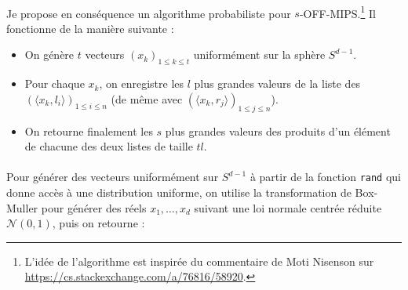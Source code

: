 \documentclass{scrartcl}
\begin{document}
\paragraph*{}
Je propose en conséquence un algorithme probabiliste pour $s$-OFF-MIPS.\footnote{L'idée
de l'algorithme est inspirée du commentaire de Moti Nisenson sur \url{https://cs.stackexchange.com/a/76816/58920}.} Il fonctionne
de la manière suivante :

\begin{itemize}
	\item On génère $t$ vecteurs $(x_k)_{1\le k\le t}$ uniformément sur la sphère $S^{d-1}$.
	\item Pour chaque $x_k$, on enregistre les $l$ plus grandes valeurs de la liste des $(\langle x_k,l_i\rangle)_{1\le i\le n}$ (de même
	avec $(\langle x_k, r_j\rangle)_{1\le j\le n}$).
	\item On retourne finalement les $s$ plus grandes valeurs des produits d'un élément de chacune des deux listes de taille $tl$. 
\end{itemize}





\paragraph*{}
Pour générer des vecteurs uniformément sur $S^{d-1}$ à partir de la fonction \texttt{rand} qui donne accès à une distribution
uniforme, on utilise la transformation de Box-Muller pour générer
des réels $x_1,\ldots,x_d$ suivant une loi normale centrée réduite $\mathcal{N}(0,1)$, puis on retourne :
\end{document}
